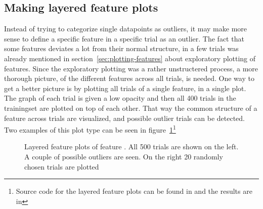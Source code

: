 \subsection{Making layered feature plots}
Instead of trying to categorize single datapoints as outliers, it may make more sense to define a specific feature in a specific trial as an outlier. The fact that some features deviates a lot from their normal structure, in a few trials was already mentioned in section~\ref{sec:plotting-features} about exploratory plotting of features. Since the exploratory plotting was a rather unstructered process, a more thorough picture, of the different features across all trials, is needed. One way to get a better picture is by plotting all trials of a single feature, in a single plot. The graph of each trial is given a low opacity and then all 400 trials in the trainingset are plotted on top of each other. That way the common structure of a feature across trials are visualized, and possible outlier trials can be detected. Two examples of this plot type can be seen in figure~\ref{fig:layered-feature-plots}\footnote{Source code for the layered feature plots can be found in  and the results are in } \par
\begin{figure}
    \centering
    \caption{Layered feature plots of feature . All 500 trials are shown on the left. A couple of possible outliers are seen. On the right 20 randomly chosen trials are plotted}
    \label{fig:layered-feature-plots}
\end{figure}
